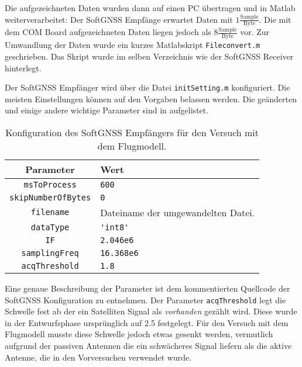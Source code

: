 Die aufgezeichneten Daten wurden dann auf einen PC übertragen und in Matlab weiterverarbeitet: Der SoftGNSS Empfänge erwartet Daten mit $1\frac{\textrm{Sample}}{\textrm{Byte}}$. Die mit dem COM Board aufgezeichneten Daten liegen jedoch als $8\frac{\textrm{Sample}}{\textrm{Byte}}$ vor. Zur Umwandlung der Daten wurde ein kurzes Matlabskript \lstinline$Fileconvert.m$ geschrieben. Das Skript wurde im selben Verzeichnis wie der SoftGNSS Receiver hinterlegt.

Der SoftGNSS Empfänger wird über die Datei \lstinline$initSetting.m$ konfiguriert. Die meisten Einstellungen können auf den Vorgaben belassen werden. Die geänderten und einige andere wichtige Parameter sind in  aufgelistet.

\begin{table}[htbp]
    \ttabbox
    {
        \caption[Konfiguration des SoftGNSS Empfängers]{Konfiguration des SoftGNSS Empfängers für den Versuch mit dem \dscubesat Flugmodell.}
        \label{SoftGNSSConfig}
    }
    {
    \begin{tabular}{c p{6cm}}
        \toprule
        Parameter               & Wert \\
        \midrule
        \lstinline$msToProcess$         & \lstinline{600} \\
        \lstinline$skipNumberOfBytes$   & \lstinline{0} \\
        \lstinline$filename$            & Dateiname der umgewandelten Datei. \\
        \lstinline$dataType$            & \lstinline$'int8'$ \\
        \lstinline$IF$                  & \lstinline$2.046e6$ \\
        \lstinline$samplingFreq$        & \lstinline$16.368e6$ \\
        \lstinline$acqThreshold$        & \lstinline$1.8$
        \bottomrule
    \end{tabular}
}
\end{table}

Eine genaue Beschreibung der Parameter ist dem kommentierten Quellcode der SoftGNSS Konfiguration zu entnehmen. Der Parameter \lstinline$acqThreshold$ legt die Schwelle fest ab der ein Satelliten Signal als \emph{vorhanden} gezählt wird. Diese wurde in der Entwurfsphase ursprünglich auf \num{2.5} festgelegt. Für den Versuch mit dem Flugmodell musste diese Schwelle jedoch etwas gesenkt werden, vermutlich aufgrund der passiven Antennen die ein schwächeres Signal liefern als die aktive Antenne, die in den Vorversuchen verwendet wurde.

